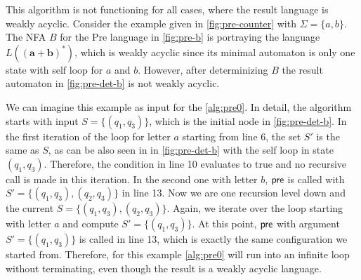 This algorithm is not functioning for all cases, where the result language is weakly acyclic. Consider the example given in \autoref{fig:pre-counter} with $\Sigma = \{a,b\}$. The NFA $B$ for the Pre language in \autoref{fig:pre-b} is portraying the language $L(\bm{(a+b)^{*}})$, which is weakly acyclic since its minimal automaton is only one state with self loop for $a$ and $b$. However, after determinizing $B$ the result automaton in \autoref{fig:pre-det-b} is not weakly acyclic. 
\par
We can imagine this example as input for the \autoref{alg:pre0}.
In detail, the algorithm starts with input $S=\{(q_{1},q_{3})\}$, which is the initial node in \autoref{fig:pre-det-b}. In the first iteration of the loop for letter $a$ starting from line 6, the set $S'$ is the same as $S$, as can be also seen in in \autoref{fig:pre-det-b} with the self loop in state  $(q_{1},q_{3})$. Therefore, the condition in line 10 evaluates to true and no recursive call is made in this iteration. In the second one with letter $b$, $\operatorname{\textsf{pre}}$ is called with $S'= \{(q_{1},q_{3}),(q_{2},q_{3})\}$ in line 13. Now we are one recursion level down and the current $S=\{(q_{1},q_{3}),(q_{2},q_{3})\}$. Again, we iterate over the loop starting with letter $a$ and compute $S'=\{(q_{1},q_{3})\}$. At this point, $\operatorname{\textsf{pre}}$ with argument $S'=\{(q_{1},q_{3})\}$ is called in line 13, which is exactly the same configuration we started from. Therefore, for this example \autoref{alg:pre0} will run into an infinite loop without terminating, even though the result is a weakly acyclic language.


